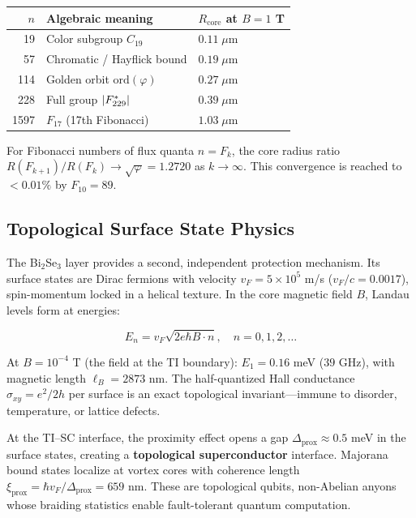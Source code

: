 \begin{center}
\begin{tabular}{@{}rll@{}}
\toprule
$n$ & \textbf{Algebraic meaning} & $R_{\text{core}}$ at $B = 1$ T \\
\midrule
19 & Color subgroup $C_{19}$ & $0.11\;\mu\text{m}$ \\
57 & Chromatic / Hayflick bound & $0.19\;\mu\text{m}$ \\
114 & Golden orbit $\mathrm{ord}(\varphi)$ & $0.27\;\mu\text{m}$ \\
228 & Full group $|{F_{229}^*}|$ & $0.39\;\mu\text{m}$ \\
1597 & $F_{17}$ (17th Fibonacci) & $1.03\;\mu\text{m}$ \\
\bottomrule
\end{tabular}
\end{center}

\noindent For Fibonacci numbers of flux quanta $n = F_k$, the core radius ratio $R(F_{k+1})/R(F_k) \to \sqrt{\varphi} = 1.2720$ as $k \to \infty$. This convergence is reached to $< 0.01\%$ by $F_{10} = 89$.

\subsection{Topological Surface State Physics}

The Bi$_2$Se$_3$ layer provides a second, independent protection mechanism. Its surface states are Dirac fermions with velocity $v_F = 5 \times 10^5$ m/s ($v_F/c = 0.0017$), spin-momentum locked in a helical texture. In the core magnetic field $B$, Landau levels form at energies:

\begin{equation}
    E_n = v_F \sqrt{2e\hbar B \cdot n}, \quad n = 0, 1, 2, \ldots
\end{equation}

At $B = 10^{-4}$ T (the field at the TI boundary): $E_1 = 0.16$ meV ($39$ GHz), with magnetic length $\ell_B = 2873$ nm. The half-quantized Hall conductance $\sigma_{xy} = e^2/2h$ per surface is an exact topological invariant---immune to disorder, temperature, or lattice defects.

At the TI--SC interface, the proximity effect opens a gap $\Delta_{\text{prox}} \approx 0.5$ meV in the surface states, creating a \textbf{topological superconductor} interface. Majorana bound states localize at vortex cores with coherence length $\xi_{\text{prox}} = \hbar v_F / \Delta_{\text{prox}} = 659$ nm. These are topological qubits, non-Abelian anyons whose braiding statistics enable fault-tolerant quantum computation.

